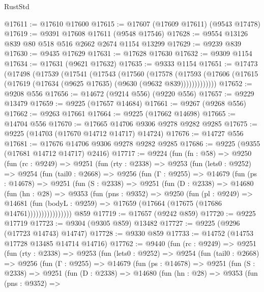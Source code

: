 \begin{lexlean}{RustStd}
\begin{coremodule}
@17611 := @17610 @17600
@17615 := @17607 (@17609 @17611) (@9543 @17478)
@17619 := @9391 @17608 @17611 (@9548 @17546)
@17628 := @9554 @13126 @839 @80 @518 @516 @2662 @2674 @1154 @13299
@17629 := @9239 @839
@17630 := @9435 @17629
@17631 := @17628 @17630
@17632 := @9309 @1154
@17634 := @17631 (@9621 @17632)
@17635 := @9333 @1154
@17651 := @17473
    (@17498
      (@17539
        (@17541
          (@17543
            (@17560
              (@17578
                (@17593
                  (@17606 (@17615 (@17619 (@17634 (@9625 @17635) (@9630 (@9632 @839)))))))))))))
@17652 := @9208 @556
@17656 := @14672 (@9214 @556) (@9220 @556)
@17657 := @9229 @13479
@17659 := @9225 (@17657 @14684)
@17661 := @9267 (@9268 @556)
@17662 := @9263 @17661
@17664 := @9225 (@17662 @14698)
@17665 := @14704 @556
@17670 := @17665 @14706 @9306 @9278 @9282 @9285
@17675 := @9225 (@14703 (@17670 @14712 @14717) @14724)
@17676 := @14727 @556
@17681 := @17676 @14706 @9306 @9278 @9282 @9285
@17686 := @9225 (@9355 (@17681 @14712 @14717) @2416)
@17717 := @9224
    (fun (fn : @58) =>
    @9250
      (fun (rc : @9249) =>
      @9251
        (fun (rty : @2338) =>
        @9253
          (fun (lets0 : @9252) =>
          @9254
            (fun (tail0 : @2668) =>
            @9256
              (fun (Γ : @9255) =>
              @14679
                (fun (ps : @14678) =>
                @9251
                  (fun (S : @2338) =>
                  @9251
                    (fun (D : @2338) =>
                    @14680
                      (fun (hn : @28) =>
                      @9353
                        (fun (pns : @9352) =>
                        @9250
                          (fun (pl : @9249) =>
                          @14681
                            (fun (bodyL : @9259) =>
                            @17659 (@17664 (@17675 (@17686 @14761))))))))))))))))
    @859
@17719 := @17657 (@9242 @859)
@17720 := @9225 @17719
@17723 := @9304 (@9305 @859) @13482
@17727 := @9225 (@9296 (@17723 @14743) @14747)
@17728 := @9330 @859
@17733 := @14752 (@14753 @17728 @13485 @14714 @14716)
@17762 := @9440
    (fun (rc : @9249) =>
    @9251
      (fun (rty : @2338) =>
      @9253
        (fun (lets0 : @9252) =>
        @9254
          (fun (tail0 : @2668) =>
          @9256
            (fun (Γ : @9255) =>
            @14679
              (fun (ps : @14678) =>
              @9251
                (fun (S : @2338) =>
                @9251
                  (fun (D : @2338) =>
                  @14680
                    (fun (hn : @28) =>
                    @9353
                      (fun (pns : @9352) =>

\end{coremodule}
\end{lexlean}
